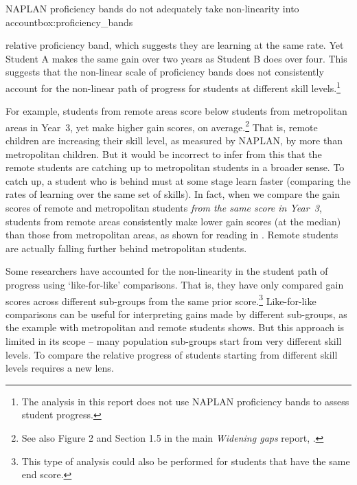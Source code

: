 \begin{bigbox*}{NAPLAN proficiency bands do not adequately take non-linearity into account}{box:proficiency_bands}
\begin{figure}[H]
\end{figure}
\vspace{-10pt}

relative proficiency band, which suggests they are learning at the same rate. Yet Student A makes the same gain over two years as Student B does over four. This suggests that the non-linear scale of proficiency bands does not consistently account for the non-linear path of progress for students at different skill levels.\footnote{The analysis in this report does not use NAPLAN proficiency bands to assess student progress.}  

\end{bigbox*}

For example, students from remote areas score below students from metropolitan areas in \mbox{Year 3}, yet make higher gain scores, on average.\footnote{See also Figure 2 and Section 1.5 in the main \textit{Widening gaps} report, \textcite{goss2016}.} That is, remote children are increasing their skill level, as measured by NAPLAN, by more than metropolitan children. But it would be incorrect to infer from this that the remote students are catching up to metropolitan students in a broader sense. To catch up, a student who is behind must at some stage learn faster (comparing the rates of learning over the same set of skills). In fact, when we compare the gain scores of remote and metropolitan students \textit{from the same score in \mbox{Year 3}}, students from remote areas consistently make lower gain scores (at the median) than those from metropolitan areas, as shown for reading in . Remote students are actually falling further behind metropolitan students. 

Some researchers have accounted for the non-linearity in the student path of progress using `like-for-like' comparisons. That is, they have only compared gain scores across different sub-groups from the same prior score.\footnote{This type of analysis could also be performed for students that have the same end score.} Like-for-like comparisons can be useful for interpreting gains made by different sub-groups, as the example with metropolitan and remote students shows. But this approach is limited in its scope -- many population sub-groups start from very different skill levels. To compare the relative progress of students starting from different skill levels requires a new lens.

